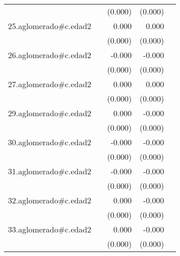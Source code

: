 {\begin{longtable}{l*{4}{D{.}{.}{-1}}}
            &                     &     (0.000)         &     (0.000)         &                     \\
\addlinespace
25.aglomerado#c.edad2&                     &       0.000\sym{*}  &       0.000         &                     \\
            &                     &     (0.000)         &     (0.000)         &                     \\
\addlinespace
26.aglomerado#c.edad2&                     &      -0.000         &      -0.000\sym{*}  &                     \\
            &                     &     (0.000)         &     (0.000)         &                     \\
\addlinespace
27.aglomerado#c.edad2&                     &       0.000\sym{*}  &       0.000         &                     \\
            &                     &     (0.000)         &     (0.000)         &                     \\
\addlinespace
29.aglomerado#c.edad2&                     &       0.000         &      -0.000         &                     \\
            &                     &     (0.000)         &     (0.000)         &                     \\
\addlinespace
30.aglomerado#c.edad2&                     &      -0.000         &      -0.000\sym{***}&                     \\
            &                     &     (0.000)         &     (0.000)         &                     \\
\addlinespace
31.aglomerado#c.edad2&                     &      -0.000         &      -0.000\sym{*}  &                     \\
            &                     &     (0.000)         &     (0.000)         &                     \\
\addlinespace
32.aglomerado#c.edad2&                     &       0.000         &      -0.000         &                     \\
            &                     &     (0.000)         &     (0.000)         &                     \\
\addlinespace
33.aglomerado#c.edad2&                     &       0.000         &      -0.000\sym{***}&                     \\
            &                     &     (0.000)         &     (0.000)         &                     \\

\end{longtable}}
